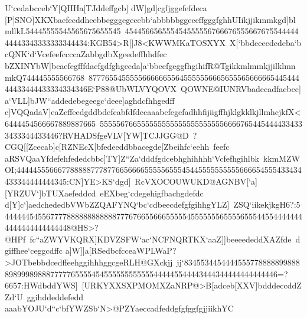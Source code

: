 {{{ U`cedabcceb`Y[QHHa[TJddeffgcb]%
 dW]gd]cgfjggefefdeca}
 \hbox{[P]SNO]XKXbaefecddheebbegggegecebb`abbbbbggeeeffgggfghhUIikjjikmmkgd]blmllkL54445555545565675655545%
 45445665655545455555676667655566767554444444443343333333344434:KGB54>R[]J8<KWWMKaTOSXYX%
 X[`bbdeeeedcdeba`bcQNK`d`VcefeefccccaZabbgdbXgeedeffhhdfec}
 \hbox{bZXINYbW]bcaefegfffdacfgdfghgecda]a`bbeefgeggfhgihifR@TgikkmlmmkjjilklmnmkQ744445555566768%
 87776554555556666665564555555666565556566666544544444433444433334334346E`P88@UbWLVYQOVX%
 QOWNE@IUNRVbadecadfacbcc]a`VLL]bJW``addedebegeegc`deee]aghdcfhhgedff}
 \hbox{c]VQQadaV]eaZcffeedgddbdefcabfdfdccaaabcfegefadhhfijiigffhjklgkklkjllmhcjkfX<6444454566667889887665%
 55555676655555555555555555555566667654454444334333433344433446?RVHADSfgeVLV[YW]TCJJGG@D%
 ?CGQ[[Zcecab]c[RZNEcX[bfedeeddbbacegde[Zbeihfc`eehh%
 feefc}
 \hbox{aRSVQaaYfdefehfededcbbc]TY]Z``Za`dddfgdcebhghihhhh`Vcfefhgihlbk%
 kkmMZWOI;444445556667788888777877665666655555655545445555555555666654555433434433344444444345:CN]YE>KS`dgd]%
 RcVXOCOUWUKD@AGNBV[`a][YRZUV`]bTUXaefeddcd%
 eEXbeg`cdegehigfbachgdefdc}
 \hbox{d[Y]c`]aedchededbVWbZZQAFYNQ`bc`cdbeecdefgfgihhgYLZ]%
 ZSQ`iikekjkgH6?:54444445455677778888888888887776766556665555545555555655556555445544444444444444444444448@HS>?@HPf%
 fc``aZWYVKQRX]KDVZSFW`ac`NCFNQRTKX`aaZ]]beeeededdXAZfde%
 dgiffhee`ceggcdffc}
 \hbox{a]W]]a[RSedbcfcceaWPLWaP?>JOTbebbdcedffeehggihhhggcgeRLH@GXckjj%
 jj`8345534454444555778888899888898999898887777765555454555555555555444445544443444344444444444446=?6657:HWdbddYWS]%
 [URKYXXSXPMOMXZaNRP@>B[adceb[XXV]bdddeccddZZd`U%
 ggihddeddefedd}
 \hbox{aaabYOJU`d``c`bfYWZSb`N>@PZYaeccadfeddgfgfggfgjjiikhYC%
}}}
